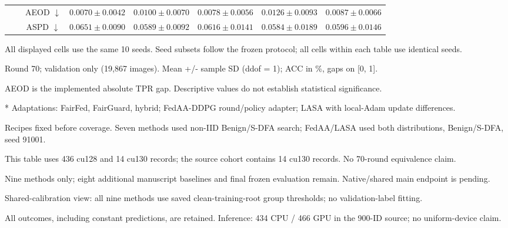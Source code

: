 \begin{table}[t]
{\begin{tabular}{l|l|c|ccccc}
 &  & AEOD $\downarrow$ & $0.0070 \pm 0.0042$ & $0.0100 \pm 0.0070$ & $0.0078 \pm 0.0056$ & $0.0126 \pm 0.0093$ & $0.0087 \pm 0.0066$ \\
 &  & ASPD $\downarrow$ & $0.0651 \pm 0.0090$ & $0.0589 \pm 0.0092$ & $0.0616 \pm 0.0141$ & $0.0584 \pm 0.0189$ & $0.0596 \pm 0.0146$ \\
\hline\hline
\end{tabular}}
\par\smallskip
\begin{minipage}{\textwidth}\scriptsize
All displayed cells use the same 10 seeds. Seed subsets follow the frozen protocol; all cells within each table use identical seeds.\par
Round 70; validation only (19,867 images). Mean +/- sample SD (ddof = 1); ACC in \%, gaps on [0, 1].\par
AEOD is the implemented absolute TPR gap. Descriptive values do not establish statistical significance.\par
* Adaptations: FairFed, FairGuard, hybrid; FedAA-DDPG round/policy adapter; LASA with local-Adam update differences.\par
Recipes fixed before coverage. Seven methods used non-IID Benign/S-DFA search; FedAA/LASA used both distributions, Benign/S-DFA, seed 91001.\par
This table uses 436 cu128 and 14 cu130 records; the source cohort contains 14 cu130 records. No 70-round equivalence claim.\par
Nine methods only; eight additional manuscript baselines and final frozen evaluation remain. Native/shared main endpoint is pending.\par
Shared-calibration view: all nine methods use saved clean-training-root group thresholds; no validation-label fitting.\par
All outcomes, including constant predictions, are retained. Inference: 434 CPU / 466 GPU in the 900-ID source; no uniform-device claim.\par
\end{minipage}
\end{table}
